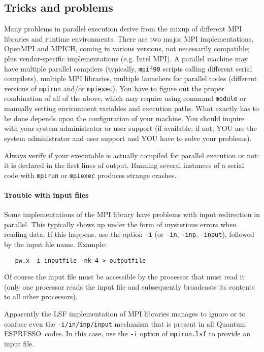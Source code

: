 \documentclass[12pt,a4paper]{article}
\def\qe{{\sc Quantum ESPRESSO}}
\begin{document}
\subsection{Tricks and problems}
\label{SubSec:badpara}

Many problems in parallel execution derive from the mixup of different
MPI libraries and runtime environments. There are two major MPI
implementations, OpenMPI and MPICH, coming in various versions,
not necessarily compatible; plus vendor-specific implementations
(e.g. Intel MPI). A parallel machine may have multiple parallel
compilers (typically, \texttt{mpif90} scripts calling different
serial compilers), multiple MPI libraries, multiple launchers
for parallel codes (different versions of \texttt{mpirun} and/or
\texttt{mpiexec}). You have to figure out the proper combination
of all of the above, which may require using command \texttt{module}
or manually setting environment variables and execution paths.
What exactly has to be done depends upon the configuration of your
machine. You should inquire with your system administrator or user
support (if available; if not, YOU are the system administrator
and user support and YOU have to solve your problems).

Always verify if your executable is actually compiled for
parallel execution or not: it is declared in the first lines
of output. Running several instances of a serial code with
\texttt{mpirun} or \texttt{mpiexec} produces strange crashes.

\paragraph{Trouble with input files}
Some implementations of the MPI library have problems with input
redirection in parallel. This typically shows up under the form of
mysterious errors when reading data. If this happens, use the option
\texttt{-i} (or \texttt{-in}, \texttt{-inp}, \texttt{-input}),
followed by the input file name.
Example:
\begin{verbatim}
   pw.x -i inputfile -nk 4 > outputfile
\end{verbatim}
Of course the
input file must be accessible by the processor that must read it
(only one processor reads the input file and subsequently broadcasts
its contents to all other processors).

Apparently the LSF implementation of MPI libraries manages to ignore or to
confuse even the \texttt{-i/in/inp/input} mechanism that is present in all
\qe\ codes. In this case, use the \texttt{-i} option of \texttt{mpirun.lsf}
to provide an input file.
\end{document}
